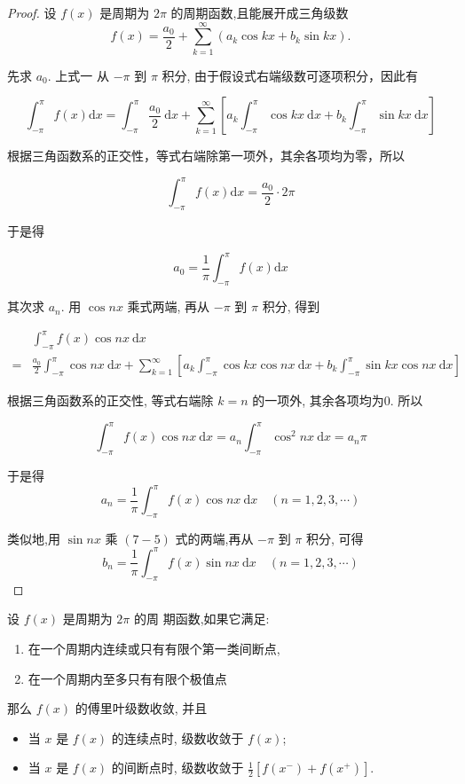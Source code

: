 \begin{proof}
    设 $ f(x) $ 是周期为 $ 2 \pi $ 的周期函数,且能展开成三角级数
$$
f(x)=\frac{a_{0}}{2}+\sum_{k=1}^{\infty}\left(a_{k} \cos k x+b_{k} \sin k x\right) .
$$

先求 $ a_{0} $. 上式一 从 $ -\pi $ 到 $ \pi $ 积分, 由于假设式右端级数可逐项积分，因此有

$$ \int_{-\pi}^{\pi} f(x) \mathrm{d} x=\int_{-\pi}^{\pi} \frac{a_{0}}{2} \mathrm{~d} x+\sum_{k=1}^{\infty}\left[a_{k} \int_{-\pi}^{\pi} \cos k x \mathrm{~d} x+b_{k} \int_{-\pi}^{\pi} \sin k x \mathrm{~d} x\right] $$

根据三角函数系的正交性，等式右端除第一项外，其余各项均为零，所以

$$ \int_{-\pi}^{\pi} f(x) \mathrm{d} x=\frac{a_{0}}{2} \cdot 2 \pi $$

于是得

$$ a_{0}=\frac{1}{\pi} \int_{-\pi}^{\pi} f(x) \mathrm{d} x $$

其次求 $ a_{n} . $ 用 $ \cos n x $ 乘式两端, 再从 $ -\pi $ 到 $ \pi $ 积分, 得到

$$ \begin{aligned}  &\int_{-\pi}^{\pi} f(x) \cos n x \mathrm{~d} x\\ =&\frac{a_{0}}{2} \int_{-\pi}^{\pi} \cos n x \mathrm{~d} x+\sum_{k=1}^{\infty}\left[a_{k} \int_{-\pi}^{\pi} \cos k x \cos n x \mathrm{~d} x+b_{k} \int_{-\pi}^{\pi} \sin k x \cos n x \mathrm{~d} x\right] \end{aligned} $$

根据三角函数系的正交性, 等式右端除 $ k=n $ 的一项外, 其余各项均为0. 所以

$$ \int_{-\pi}^{\pi} f(x) \cos n x \mathrm{~d} x=a_{n} \int_{-\pi}^{\pi} \cos ^{2} n x \mathrm{~d} x=a_{n} \pi $$

于是得$$ a_{n}=\frac{1}{\pi} \int_{-\pi}^{\pi} f(x) \cos n x \mathrm{~d} x \quad(n=1,2,3, \cdots) $$

类似地,用 $ \sin n x $ 乘 $ (7-5) $ 式的两端,再从 $ -\pi $ 到 $ \pi $ 积分, 可得
$$
b_{n}=\frac{1}{\pi} \int_{-\pi}^{\pi} f(x) \sin n x \mathrm{~d} x \quad(n=1,2,3, \cdots)
$$
\end{proof}

\begin{theorem}
    设 $ f(x) $ 是周期为 $ 2 \pi $ 的周 期函数,如果它满足:

    \begin{enumerate}
        \item 在一个周期内连续或只有有限个第一类间断点,
        \item 在一个周期内至多只有有限个极值点
    \end{enumerate}

    那么 $ f(x) $ 的傅里叶级数收敛, 并且

    \begin{itemize}
    \item 当 $ x $ 是 $ f(x) $ 的连续点时, 级数收敛于 $ f(x) $;
    \item 当 $ x $ 是 $ f(x) $ 的间断点时, 级数收敛于 $ \frac{1}{2}\left[f\left(x^{-}\right)+f\left(x^{+}\right)\right] $.
    \end{itemize}
\end{theorem}

